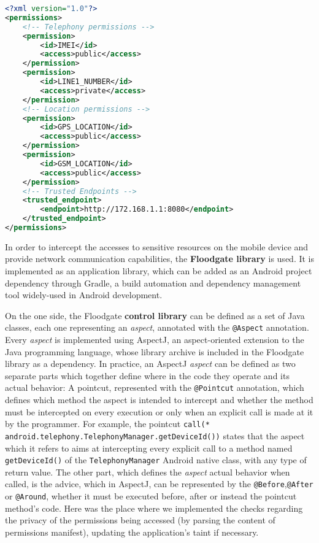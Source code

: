 \begin{lstlisting}[language=XML,caption=Permissions manifest example, label=lst:permissions-manifest]
<?xml version="1.0"?>
<permissions>
    <!-- Telephony permissions -->
    <permission>
        <id>IMEI</id>
        <access>public</access>
    </permission>
    <permission>
        <id>LINE1_NUMBER</id>
        <access>private</access>
    </permission>
    <!-- Location permissions -->
    <permission>
        <id>GPS_LOCATION</id>
        <access>public</access>
    </permission>
    <permission>
        <id>GSM_LOCATION</id>
        <access>public</access>
    </permission>
    <!-- Trusted Endpoints -->
    <trusted_endpoint>
        <endpoint>http://172.168.1.1:8080</endpoint>
    </trusted_endpoint>
</permissions>
\end{lstlisting}

In order to intercept the accesses to sensitive resources on the mobile device and provide network communication capabilities, the \textbf{Floodgate library} is used. It is implemented as an application library, which can be added as an Android project dependency through Gradle, a build automation and dependency management tool widely-used in Android development.

On the one side, the Floodgate \textbf{control library} can be defined as a set of Java classes, each one representing an \textit{aspect}, annotated with the \texttt{@Aspect} annotation. Every \textit{aspect} is implemented using AspectJ, an aspect-oriented extension to the Java programming language, whose library archive is included in the Floodgate library as a dependency. In practice, an AspectJ \textit{aspect} can be defined as two separate parts which together define where in the code they operate and its actual behavior: A pointcut, represented with the \texttt{@Pointcut} annotation, which defines which method the aspect is intended to intercept and whether the method must be intercepted on every execution or only when an explicit call is made at it by the programmer. For example, the pointcut \texttt{call(* android.telephony.TelephonyManager.getDeviceId())} states that the aspect which it refers to aims at intercepting every explicit call to a method named \texttt{getDeviceId()} of the \texttt{TelephonyManager} Android native class, with any type of return value. The other part, which defines the \textit{aspect} actual behavior when called, is the advice, which in AspectJ, can be represented by the \texttt{@Before},\texttt{@After} or \texttt{@Around}, whether it must be executed before, after or instead the pointcut method's code. Here was the place where we implemented the checks regarding the privacy of the permissions being accessed (by parsing the content of permissions manifest), updating the application's taint if necessary.

